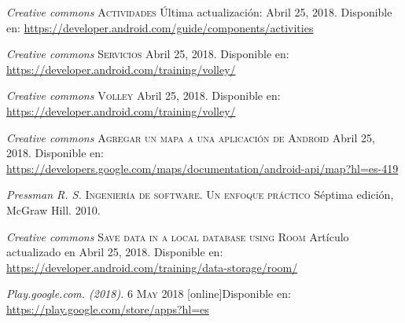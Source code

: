 \begin{thebibliography}{X}
		\textit{Creative commons}
		\textsc{Actividades}  Última actualización: Abril 25, 2018. 
		Disponible en: \url{https://developer.android.com/guide/components/activities}

		\textit{Creative commons}
		\textsc{Servicios} Abril 25, 2018. 
		Disponible en: \url{https://developer.android.com/training/volley/}
		
		\textit{Creative commons}
		\textsc{Volley} Abril 25, 2018. 
		Disponible en: \url{https://developer.android.com/training/volley/}	
		
		\textit{Creative commons}
		\textsc{Agregar un mapa a una aplicación de Android} Abril 25, 2018. 
		Disponible en: \url{https://developers.google.com/maps/documentation/android-api/map?hl=es-419}
		
		\textit{Pressman R. S.}
		\textsc{Ingeniería de software. Un enfoque práctico} Séptima edición, McGraw Hill. 2010.

		\textit{Creative commons}
		\textsc{ Save data in a local database using Room } Artículo actualizado en Abril 25, 2018.
		Disponible en: \url{https://developer.android.com/training/data-storage/room/}
		
		\textit{Play.google.com. (2018).}
		\textsc{ 6 May 2018} [online]Disponible en: \url{ https://play.google.com/store/apps?hl=es} 
	




	



		
\end{thebibliography}
